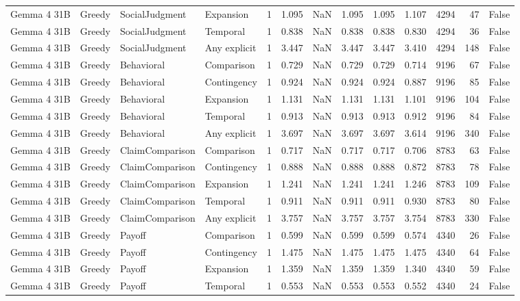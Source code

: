 \begin{tabular}{llllrrrrrrrrr}
Gemma 4 31B & Greedy & SocialJudgment & Expansion & 1 & 1.095 & NaN & 1.095 & 1.095 & 1.107 & 4294 & 47 & False \\
Gemma 4 31B & Greedy & SocialJudgment & Temporal & 1 & 0.838 & NaN & 0.838 & 0.838 & 0.830 & 4294 & 36 & False \\
Gemma 4 31B & Greedy & SocialJudgment & Any explicit & 1 & 3.447 & NaN & 3.447 & 3.447 & 3.410 & 4294 & 148 & False \\
Gemma 4 31B & Greedy & Behavioral & Comparison & 1 & 0.729 & NaN & 0.729 & 0.729 & 0.714 & 9196 & 67 & False \\
Gemma 4 31B & Greedy & Behavioral & Contingency & 1 & 0.924 & NaN & 0.924 & 0.924 & 0.887 & 9196 & 85 & False \\
Gemma 4 31B & Greedy & Behavioral & Expansion & 1 & 1.131 & NaN & 1.131 & 1.131 & 1.101 & 9196 & 104 & False \\
Gemma 4 31B & Greedy & Behavioral & Temporal & 1 & 0.913 & NaN & 0.913 & 0.913 & 0.912 & 9196 & 84 & False \\
Gemma 4 31B & Greedy & Behavioral & Any explicit & 1 & 3.697 & NaN & 3.697 & 3.697 & 3.614 & 9196 & 340 & False \\
Gemma 4 31B & Greedy & ClaimComparison & Comparison & 1 & 0.717 & NaN & 0.717 & 0.717 & 0.706 & 8783 & 63 & False \\
Gemma 4 31B & Greedy & ClaimComparison & Contingency & 1 & 0.888 & NaN & 0.888 & 0.888 & 0.872 & 8783 & 78 & False \\
Gemma 4 31B & Greedy & ClaimComparison & Expansion & 1 & 1.241 & NaN & 1.241 & 1.241 & 1.246 & 8783 & 109 & False \\
Gemma 4 31B & Greedy & ClaimComparison & Temporal & 1 & 0.911 & NaN & 0.911 & 0.911 & 0.930 & 8783 & 80 & False \\
Gemma 4 31B & Greedy & ClaimComparison & Any explicit & 1 & 3.757 & NaN & 3.757 & 3.757 & 3.754 & 8783 & 330 & False \\
Gemma 4 31B & Greedy & Payoff & Comparison & 1 & 0.599 & NaN & 0.599 & 0.599 & 0.574 & 4340 & 26 & False \\
Gemma 4 31B & Greedy & Payoff & Contingency & 1 & 1.475 & NaN & 1.475 & 1.475 & 1.475 & 4340 & 64 & False \\
Gemma 4 31B & Greedy & Payoff & Expansion & 1 & 1.359 & NaN & 1.359 & 1.359 & 1.340 & 4340 & 59 & False \\
Gemma 4 31B & Greedy & Payoff & Temporal & 1 & 0.553 & NaN & 0.553 & 0.553 & 0.552 & 4340 & 24 & False \\

\end{tabular}
